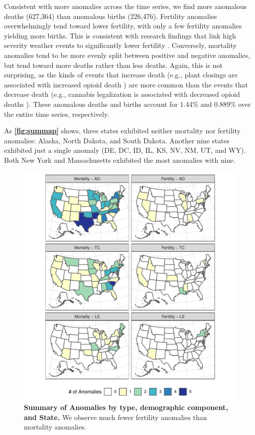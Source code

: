 \documentclass[12pt]{article}
\begin{document}
Consistent with more anomalies across the time series, we find more
anomalous deaths (627,364) than anomalous births (226,476). Fertility
anomalies overwhelmingly tend toward lower fertility, with only a few
fertility anomalies yielding more births. This is consistent with
research findings that link high severity weather events to
significantly lower fertility \citep{Evans2008Hurricanebirth}.
Conversely, mortality anomalies tend to be more evenly split between
positive and negative anomalies, but tend toward more deaths rather than
less deaths. Again, this is not surprising, as the kinds of events that
increase death (e.g., plant closings are associated with increased
opioid death \citep{Venkataramani2019}) are more common than the events
that decrease death (e.g., cannabis legalization is associated with
decreased opioid deaths \citep{Livingston2017Cannabis}). These anomalous
deaths and births account for 1.44\% and 0.889\% over the entire time
series, respectively.

As \textbf{\autoref{fig:summap}} shows, three states exhibited neither
mortality nor fertility anomalies: Alaska, North Dakota, and South
Dakota. Another nine states exhibited just a single anomaly (DE, DC, ID,
IL, KS, NV, NM, UT, and WY). Both New York and Massachusetts exhibited
the most anomalies with nine.

\begin{figure}
\centering
\includegraphics{manuscript_files/figure-latex/AnomalyMap-1.pdf}
\caption{\textbf{Summary of Anomalies by type, demographic component, and State.}
We observe much fewer fertility anomalies than mortality anomalies.
\label{fig:summap}}
\end{figure}
\end{document}
